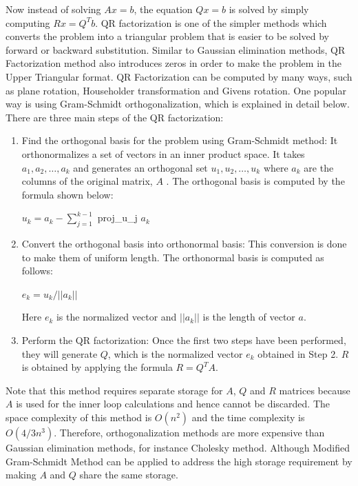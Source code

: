 Now instead of solving $Ax = b$, the equation $Qx=b$ is solved by simply computing $Rx = Q^{T}b$. QR factorization is one of the simpler methods which converts the problem into a triangular problem that is easier to be solved by forward or backward substitution. Similar to Gaussian elimination methods, QR Factorization method also introduces zeros in order to make the problem in the Upper Triangular format. QR Factorization can be computed by many ways, such as plane rotation, Householder transformation and Givens rotation. One popular way is using Gram-Schmidt orthogonalization, which is explained in detail below. There are three main steps of the QR factorization: 
\begin{enumerate}
     \item Find the orthogonal basis for the problem using Gram-Schmidt method: It orthonormalizes a set of vectors in an inner product space. It takes $a_1,a_2,\ldots, a_k$ and generates an orthogonal set $u_1,u_2,\ldots, u_k$ where $a_k$ are the columns of the original matrix, $A$ . The orthogonal basis is computed by the formula shown below:
     \begin{center}
   $u_k = a_k - \sum_{j=1}^{k-1}$ proj\_u\_{j} $a_k$
     \end{center}
     
     \item Convert the orthogonal basis into orthonormal basis: This conversion is done to make them of uniform length. The orthonormal basis is computed as follows: 
     \begin{center}
     $e_k = u_k / ||a_k||$ 
     \end{center}
     Here $e_k$ is the normalized vector and $||a_k||$ is the length of vector $a$.
     
     \item Perform the QR factorization: Once the first two steps have been performed, they will generate $Q$, which is the normalized vector  $e_k$ obtained in Step 2. $R$ is obtained by applying the formula $R = Q^T A$. 
\end{enumerate}

Note that this method requires separate storage for $A$, $Q$ and $R$ matrices because $A$ is used for the inner loop calculations and hence cannot be discarded. The space complexity of this method is $ O (n^2)$ and the time complexity is $ O (4/3 n^3)$. Therefore, orthogonalization methods are more expensive than Gaussian elimination methods, for instance Cholesky method. Although Modified Gram-Schmidt Method can be applied to address the high storage requirement by making $A$ and $Q$ share the same storage. 

